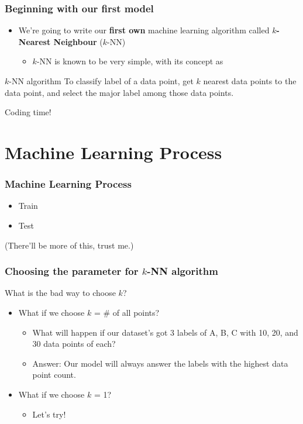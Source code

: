 \documentclass[aspectratio=169]{beamer}
\begin{document}
\begin{frame}
	\frametitle{Beginning with our first model}
	\begin{itemize}
		\item<2-> We're going to write our \textbf{first own} machine learning algorithm called \textbf{$k$-Nearest Neighbour} ($k$-NN)
		      \begin{itemize}
			      \item<3-> $k$-NN is known to be very simple, with its concept as
		      \end{itemize}
	\end{itemize}
	\begin{block}{$k$-NN algorithm}
		To classify label of a data point, get $k$ nearest data points to the data point, and select the major label among those data points.
	\end{block}
\end{frame}

\begin{frame}
	\Huge{Coding time!}
\end{frame}

\section{Machine Learning Process}

\begin{frame}
	\frametitle{Machine Learning Process}
	\begin{itemize}
		\item<2-> Train
		\item<3-> Test
	\end{itemize}
	 (There'll be more of this, trust me.)
\end{frame}

\begin{frame}
	\frametitle{Choosing the parameter for $k$-NN algorithm}
	 What is the bad way to choose $k$?
	\begin{itemize}
		\item<3-> What if we choose $k$ = \# of all points?
		      \begin{itemize}
			      \item<4-> What will happen if our dataset's got 3 labels of A, B, C with 10, 20, and 30 data points of each?
			      \item<5-> Answer: Our model will always answer the labels with the highest data point count.
		      \end{itemize}
		\item<6-> What if we choose $k$ = 1?
		      \begin{itemize}
			      \item<7-> Let's try!
		      \end{itemize}
	\end{itemize}
\end{frame}
\end{document}
